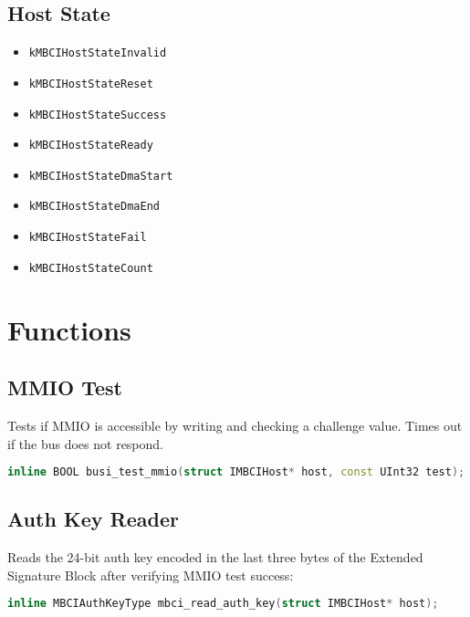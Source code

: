 \documentclass{article}
\begin{document}
\subsection*{Host State}
\begin{itemize}
  \item \texttt{kMBCIHostStateInvalid}
  \item \texttt{kMBCIHostStateReset}
  \item \texttt{kMBCIHostStateSuccess}
  \item \texttt{kMBCIHostStateReady}
  \item \texttt{kMBCIHostStateDmaStart}
  \item \texttt{kMBCIHostStateDmaEnd}
  \item \texttt{kMBCIHostStateFail}
  \item \texttt{kMBCIHostStateCount}
\end{itemize}

\section{Functions}

\subsection*{MMIO Test}
Tests if MMIO is accessible by writing and checking a challenge value. Times out if the bus does not respond.

\begin{lstlisting}[language=C++,basicstyle=\ttfamily\footnotesize]
inline BOOL busi_test_mmio(struct IMBCIHost* host, const UInt32 test);
\end{lstlisting}

\subsection*{Auth Key Reader}
Reads the 24-bit auth key encoded in the last three bytes of the Extended Signature Block after verifying MMIO test success:

\begin{lstlisting}[language=C++,basicstyle=\ttfamily\footnotesize]
inline MBCIAuthKeyType mbci_read_auth_key(struct IMBCIHost* host);
\end{lstlisting}
\end{document}
